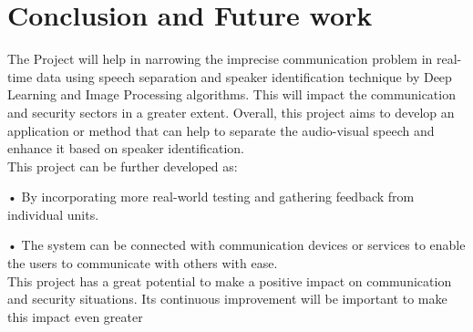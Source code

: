 \documentclass[12pt,a4paper]{report}
\begin{document}
\chapter{Conclusion and Future work}
The Project will help in narrowing the imprecise communication problem in real-time data using 
speech separation and speaker identification technique by Deep Learning and Image Processing 
algorithms. This will impact the communication and security sectors in a greater extent. Overall, this 
project aims to develop an application or method that can help to separate the audio-visual speech and 
enhance it based on speaker identification.
\\
This project can be further developed as:
\item • By incorporating more real-world testing and gathering feedback from 
individual units.
\item • The system can be connected with communication devices or services to enable
the users to communicate with others with ease.
\\

This project has a great potential to make a positive impact on communication and security situations. Its continuous improvement will be important to make this impact 
even greater
\end{document}
